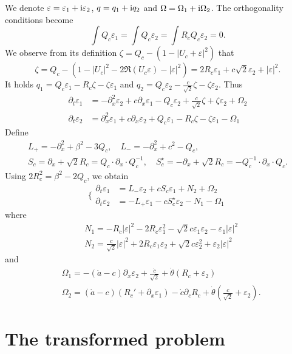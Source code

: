 \documentclass[11pt]{amsart}
\theoremstyle{remark}
\newcommand\ep{\varepsilon}
\newcommand\ii{\textnormal{i}}
\renewcommand{\Re}{\mathfrak{R}}
\begin{document}
We denote $\ep=\ep_1+\ii \ep_2$, $q=q_1+\ii q_2$ and 
$\Omega=\Omega_1+\ii \Omega_2$. 
The orthogonality conditions become
\begin{equation*}
\int Q_c \ep_1= \int Q_c \ep_2 = \int R_c Q_c \ep_2=0.
\end{equation*}
We observe from its definition $\zeta=Q_c - (1-|U_c+\ep|^2)$ that
\[
\zeta= Q_c -( 1 - |U_c|^2 - 2\Re(U_c \ep)-|\ep|^2)
= 2R_c\ep_1 + c \sqrt{2} \ep_2 +|\ep|^2.
\]
It holds $q_1 =Q_c \ep_1-R_c\zeta -\zeta \ep_1$ and
$q_2 =Q_c \ep_2-\frac c{\sqrt{2}} \zeta-\zeta \ep_2$. Thus
\begin{align*}
\partial_t\ep_1&=-\partial_x^2 \ep_2+c\partial_x\ep_1-Q_c \ep_2+\frac{c}{\sqrt{2}}\zeta+\zeta \ep_2+\Omega_2\\
\partial_t\ep_2&=\partial_x^2 \ep_1+c\partial_x\ep_2+Q_c \ep_1-R_c\zeta -\zeta\ep_1 - \Omega_1
\end{align*}
Define
\begin{gather*}
 L_+ =-\partial^2_x +\beta^2 -3Q_c ,\quad
L_- =-\partial_x^2 +c^2 -Q_c, \\
 S_c =\partial_x+\sqrt{2} R_c = Q_c \cdot \partial_x \cdot Q_c^{-1}, 
\quad S_c^\star=-\partial_x+\sqrt{2} R_c
 =- Q_c^{-1}\cdot \partial_x \cdot Q_c.
\end{gather*}
Using $2R_c^2=\beta^2-2Q_c$, we obtain
\[
\Bigg\{\begin{aligned}
\partial_t\ep_1&=L_-\ep_2+c S_c\ep_1+N_2+\Omega_2\\
\partial_t\ep_2&=-L_+\ep_1-cS_c^\star\ep_2-N_1-\Omega_1
\end{aligned}
\]
where
\begin{align*}
&N_1=-R_c|\ep|^2-2 R_c \ep_1^2-\sqrt{2} c\ep_1\ep_2 -\ep_1|\ep|^2\\
&N_2=\frac{c}{\sqrt{2}} |\ep|^2+2 R_c\ep_1\ep_2+\sqrt{2} c \ep_2^2+\ep_2|\ep|^2
\end{align*}
and
\begin{align*}
&\Omega_1=-(\dot a -c)\partial_x\ep_2+\frac{\dot c}{\sqrt{2}}
+\dot\theta(R_c+\ep_2) \\
& 
\Omega_2 = (\dot a-c)(R_c'+\partial_x\ep_1)
-\dot c \partial_c R_c+\dot\theta\left(\frac{c}{\sqrt{2}}+\ep_2\right).
\end{align*}

\section{The transformed problem}
\end{document}

